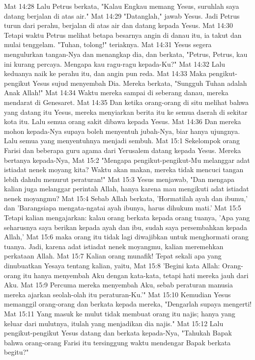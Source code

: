 Mat 14:28  Lalu Petrus berkata, "Kalau Engkau memang Yesus, suruhlah saya datang berjalan di atas air."
Mat 14:29  "Datanglah," jawab Yesus. Jadi Petrus turun dari perahu, berjalan di atas air dan datang kepada Yesus.
Mat 14:30  Tetapi waktu Petrus melihat betapa besarnya angin di danau itu, ia takut dan mulai tenggelam. "Tuhan, tolong!" teriaknya.
Mat 14:31  Yesus segera mengulurkan tangan-Nya dan menangkap dia, dan berkata, "Petrus, Petrus, kau ini kurang percaya. Mengapa kau ragu-ragu kepada-Ku?"
Mat 14:32  Lalu keduanya naik ke perahu itu, dan angin pun reda.
Mat 14:33  Maka pengikut-pengikut Yesus sujud menyembah Dia. Mereka berkata, "Sungguh Tuhan adalah Anak Allah!"
Mat 14:34  Waktu mereka sampai di seberang danau, mereka mendarat di Genesaret.
Mat 14:35  Dan ketika orang-orang di situ melihat bahwa yang datang itu Yesus, mereka menyiarkan berita itu ke semua daerah di sekitar kota itu. Lalu semua orang sakit dibawa kepada Yesus.
Mat 14:36  Dan mereka mohon kepada-Nya supaya boleh menyentuh jubah-Nya, biar hanya ujungnya. Lalu semua yang menyentuhnya menjadi sembuh.
Mat 15:1  Sekelompok orang Farisi dan beberapa guru agama dari Yerusalem datang kepada Yesus. Mereka bertanya kepada-Nya,
Mat 15:2  "Mengapa pengikut-pengikut-Mu melanggar adat istiadat nenek moyang kita? Waktu akan makan, mereka tidak mencuci tangan lebih dahulu menurut peraturan!"
Mat 15:3  Yesus menjawab, "Dan mengapa kalian juga melanggar perintah Allah, hanya karena mau mengikuti adat istiadat nenek moyangmu?
Mat 15:4  Sebab Allah berkata, 'Hormatilah ayah dan ibumu,' dan 'Barangsiapa mengata-ngatai ayah ibunya, harus dihukum mati.'
Mat 15:5  Tetapi kalian mengajarkan: kalau orang berkata kepada orang tuanya, 'Apa yang seharusnya saya berikan kepada ayah dan ibu, sudah saya persembahkan kepada Allah,'
Mat 15:6  maka orang itu tidak lagi diwajibkan untuk menghormati orang tuanya. Jadi, karena adat istiadat nenek moyangmu, kalian meremehkan perkataan Allah.
Mat 15:7  Kalian orang munafik! Tepat sekali apa yang dinubuatkan Yesaya tentang kalian, yaitu,
Mat 15:8  'Begini kata Allah: Orang-orang itu hanya menyembah Aku dengan kata-kata, tetapi hati mereka jauh dari Aku.
Mat 15:9  Percuma mereka menyembah Aku, sebab peraturan manusia mereka ajarkan seolah-olah itu peraturan-Ku.'"
Mat 15:10  Kemudian Yesus memanggil orang-orang dan berkata kepada mereka, "Dengarlah supaya mengerti!
Mat 15:11  Yang masuk ke mulut tidak membuat orang itu najis; hanya yang keluar dari mulutnya, itulah yang menjadikan dia najis."
Mat 15:12  Lalu pengikut-pengikut Yesus datang dan berkata kepada-Nya, "Tahukah Bapak bahwa orang-orang Farisi itu tersinggung waktu mendengar Bapak berkata begitu?"
